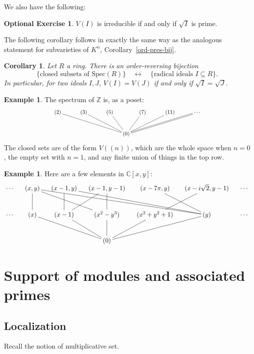 \documentclass{amsart}[12pt]
\numberwithin{equation}{section}
\theoremstyle{plain} %
\newtheorem{corollary}[equation]{Corollary}
\theoremstyle{definition}
\newtheorem{example}[equation]{Example}
\newtheorem{exer}[equation]{Optional Exercise}
\theoremstyle{remark}
\renewcommand{\sec}[1]{\section{#1}}
\newcommand{\ssec}[1]{\subsection{#1}}
\newcommand{\Spec}{\mathrm{Spec}}
\begin{document}
We also have the following:

\begin{exer} $V(I)$ is irreducible if and only if $\sqrt{I}$ is prime.
\end{exer}

The following corollary follows in exactly the same way as the analogous statement for subvarieties of $K^n$, Corollary~\ref{ord-pres-bij}.

\begin{corollary}
	Let $R$ a ring.
	There is an order-reversing bijection
	\[\{ \text{closed subsets of $\Spec(R)$} \}  \quad \leftrightarrow \quad \{\text{radical ideals $I\subseteq R$}\}.\]
	In particular, for two ideals $I,J$, $V(I)=V(J)$ if and only if $\sqrt{I}=\sqrt{J}$.
\end{corollary}

\begin{example} The spectrum of $\mathbb{Z}$ is, as a poset:
\[ \xymatrix@C-1pc{ &&&& & (2) &  & (3) &  & (5) & & (7) & & (11) & & \cdots &&&&& \\ 
&&&& &  & &  & &  & (0)\ar@{-}[lllllu] \ar@{-}[lllu] \ar@{-}[lu] \ar@{-}[ru] \ar@{-}[rrru] \ar@{=}[rrrrru] &&&&& &&&&& }\]
The closed sets are of the form $V((n))$, which are the whole space when $n=0$, the empty set with $n=1$, and any finite union of things in the top row.
\end{example}

\begin{example} Here are a few elements in $\mathbb{C}[x,y]$: 
\[ \xymatrix@C-1pc{\cdots & (x,y) & (x-1,y) & (x-1,y-1) & (x-7\pi,y) & (x-i\sqrt{2},y-1) & \cdots \\
\cdots & (x)\ar@{-}[u] & (x-1)\ar@{-}[u]\ar@{-}[ru] & (x^2-y^3) \ar@{-}[u]\ar@{-}[llu]& (x^2+y^2+1)\ar@{-}[ru] & (y)\ar@{-}[lu]\ar@{-}[lllu]\ar@{-}[llllu] & \cdots \\
&&&(0)\ar@{-}[llu]\ar@{-}[lu]\ar@{-}[u]\ar@{-}[ru]\ar@{-}[rru] &&&
}\]
\end{example}


\sec{Support of modules and associated primes}

\ssec{Localization}

Recall the notion of multiplicative set.
\end{document}
